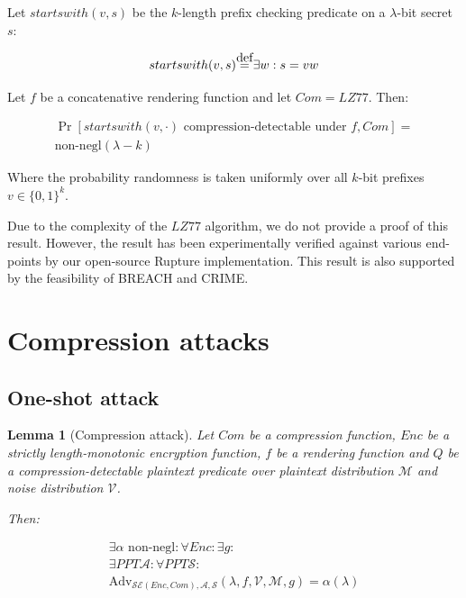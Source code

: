 \documentclass{sig-alternate-05-2015}
\newtheorem{lemma}{Lemma}
\newcommand\defeq{\stackrel{\mathclap{\normalfont\mbox{def}}}{=}}
\begin{document}
Let $startswith(v, s)$ be the $k$-length prefix checking predicate on a
$\lambda$-bit secret $s$:

\begin{equation*}
    startswith(v, s) \defeq \exists w: s = v w
\end{equation*}

Let $f$ be a concatenative rendering function and let $Com = LZ77$. Then:

\begin{align*}
\Pr[startswith(v, \cdot) \textrm{ compression-detectable under } f, Com] =\\ \text{non-negl}(\lambda - k)
\end{align*}

Where the probability randomness is taken uniformly over all $k$-bit prefixes $v \in \{0, 1\}^k$.

Due to the complexity of the $LZ77$ algorithm, we do not provide a proof of this result. However, the
result has been experimentally verified against various end-points by our open-source Rupture implementation.
This result is also supported by the feasibility of BREACH and CRIME.

\section{Compression attacks}\label{sec:comattack}

\subsection{One-shot attack}

\begin{lemma}[Compression attack]

Let $Com$ be a compression function, $Enc$ be a strictly length-monotonic
encryption function, $f$ be a rendering function and $Q$ be a
compression-detectable plaintext predicate over plaintext distribution
$\mathcal{M}$ and noise distribution $\mathcal{V}$.

Then:

\begin{align*}
    \exists \alpha \text{ non-negl}:
    \forall Enc:
    \exists g:\\
    \exists PPT \mathcal{A}:
    \forall PPT \mathcal{S}:\\
    \text{Adv}_{\mathcal{SE}(Enc, Com), \mathcal{A}, \mathcal{S}}
    (\lambda, f, \mathcal{V}, \mathcal{M}, g) = \alpha(\lambda)
\end{align*}

\end{lemma}
\end{document}
